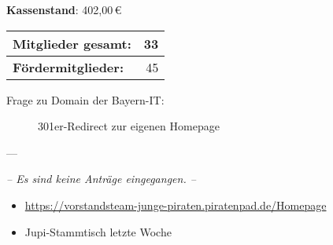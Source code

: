 \begin{Protokoll}
    
    \textbf{Kassenstand}: 402,00\,\euro
    
    \begin{center}
        \begin{tabular}{|l||r|}
            \hline
            \textbf{Mitglieder gesamt:}             &  33 \\
            \hline
            \textbf{Fördermitglieder:}                & 45 \\                
            \hline
            \hline
        \end{tabular}
    \end{center}
    
    
    \begin{description}
        \item[Frage zu Domain der Bayern-IT:] 301er-Redirect zur eigenen Homepage
    \end{description}
    
     ---
    
    \emph{-- Es sind keine Anträge eingegangen. --}
    
    \begin{itemize}
        \item \url{https://vorstandsteam-junge-piraten.piratenpad.de/Homepage}
        \item Jupi-Stammtisch letzte Woche
    \end{itemize}
    
  
  
    
    
\end{Protokoll}


